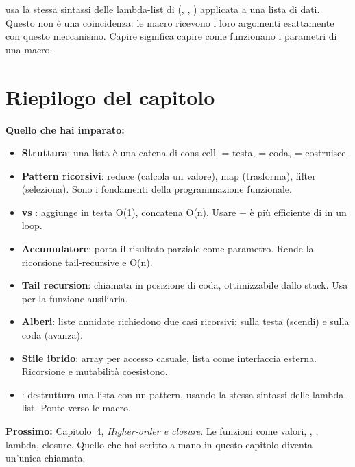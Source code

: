 \begin{intuizione}
 usa la stessa sintassi delle lambda-list di 
(, , ) applicata a una lista di dati.
Questo non è una coincidenza: le macro ricevono i loro argomenti
esattamente con questo meccanismo.
Capire  significa capire come funzionano
i parametri di una macro.
\end{intuizione}

\section*{Riepilogo del capitolo}

\begin{tcolorbox}[
  enhanced,
  colback=csBlue!5, colframe=csBlue!40,
  arc=4pt, boxrule=0.6pt,
  left=14pt, right=14pt, top=12pt, bottom=12pt,
  before skip=16pt, after skip=16pt
]
\textbf{Quello che hai imparato:}

\medskip
\begin{itemize}
  \item \textbf{Struttura}: una lista è una catena di cons-cell.
         = testa,  = coda,  = costruisce.
  \item \textbf{Pattern ricorsivi}: reduce (calcola un valore),
        map (trasforma), filter (seleziona).
        Sono i fondamenti della programmazione funzionale.
  \item \textbf{ vs }:  aggiunge in testa O(1),
         concatena O(n). Usare  + 
        è più efficiente di  in un loop.
  \item \textbf{Accumulatore}: porta il risultato parziale come parametro.
        Rende la ricorsione tail-recursive e O(n).
  \item \textbf{Tail recursion}: chiamata in posizione di coda,
        ottimizzabile dallo stack. Usa  per la funzione ausiliaria.
  \item \textbf{Alberi}: liste annidate richiedono due casi ricorsivi:
        sulla testa (scendi) e sulla coda (avanza).
  \item \textbf{Stile ibrido}: array per accesso casuale, lista come
        interfaccia esterna. Ricorsione e mutabilità coesistono.
  \item \textbf{}: destruttura una lista con un pattern,
        usando la stessa sintassi delle lambda-list. Ponte verso le macro.
\end{itemize}

\medskip
\textbf{Prossimo:} Capitolo~4, \emph{Higher-order e closure}.
Le funzioni come valori, , , lambda, closure.
Quello che hai scritto a mano in questo capitolo diventa
un'unica chiamata.
\end{tcolorbox}


